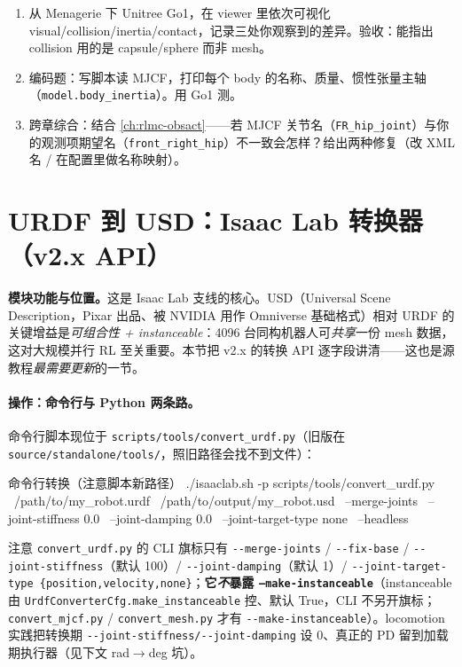 \begin{practice}[动手：转换并体检一台四足]
\begin{enumerate}
  \item 从 Menagerie 下 Unitree Go1，在 viewer 里依次可视化 visual/collision/inertia/contact，记录三处你观察到的差异。验收：能指出 collision 用的是 capsule/sphere 而非 mesh。
  \item 编码题：写脚本读 MJCF，打印每个 body 的名称、质量、惯性张量主轴（\texttt{model.body\_inertia}）。用 Go1 测。
  \item 跨章综合：结合 \cref{ch:rlmc-obsact}——若 MJCF 关节名（\texttt{FR\_hip\_joint}）与你的观测项期望名（\texttt{front\_right\_hip}）不一致会怎样？给出两种修复（改 XML 名 / 在配置里做名称映射）。
\end{enumerate}
\end{practice}

\section{URDF 到 USD：Isaac Lab 转换器（v2.x API）}
\label{sec:rlmc-assets-usd}

\textbf{模块功能与位置。}这是 Isaac Lab 支线的核心。USD（Universal Scene Description，Pixar 出品、被 NVIDIA 用作 Omniverse 基础格式）相对 URDF 的关键增益是\emph{可组合性 + instanceable}：4096 台同构机器人可\emph{共享}一份 mesh 数据，这对大规模并行 RL 至关重要。本节把 v2.x 的转换 API 逐字段讲清——这也是源教程\emph{最需要更新}的一节。

\paragraph{操作：命令行与 Python 两条路。}命令行脚本现位于 \verb|scripts/tools/convert_urdf.py|（旧版在 \verb|source/standalone/tools/|，照旧路径会找不到文件）：

\begin{codebox}[bash]{命令行转换（注意脚本新路径）}
./isaaclab.sh -p scripts/tools/convert_urdf.py \
    /path/to/my_robot.urdf \
    /path/to/output/my_robot.usd \
    --merge-joints \
    --joint-stiffness 0.0 \
    --joint-damping 0.0 \
    --joint-target-type none \
    --headless
\end{codebox}

\noindent{}注意 \texttt{convert\_urdf.py} 的 CLI 旗标只有 \verb|--merge-joints| / \verb|--fix-base| / \verb|--joint-stiffness|（默认 100）/ \verb|--joint-damping|（默认 1）/ \verb|--joint-target-type {position,velocity,none}|；\textbf{它\emph{不}暴露 \texttt{--make-instanceable}}（instanceable 由 \texttt{UrdfConverterCfg.make\_instanceable} 控、默认 True，CLI 不另开旗标；\texttt{convert\_mjcf.py} / \texttt{convert\_mesh.py} 才有 \verb|--make-instanceable|）。locomotion 实践把转换期 \verb|--joint-stiffness/--joint-damping| 设 0、真正的 PD 留到加载期执行器（见下文 rad$\to$deg 坑）。

